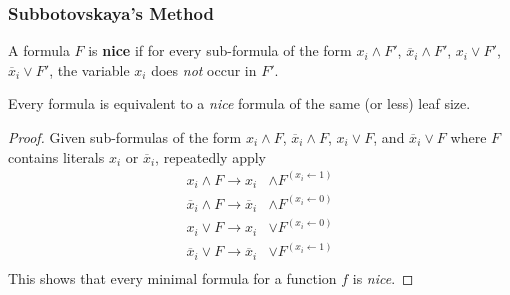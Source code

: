 \documentclass[11pt]{article}
\begin{document}
	\subsubsection{Subbotovskaya's Method} 
	\begin{definition}
		A formula $F$ is \textbf{nice} if for every sub-formula of the form $x_i \land F'$, $\overline{x}_i \land F'$, $x_i \lor F'$, $\overline{x}_i \lor F'$, the variable $x_i$ does \emph{not} occur in $F'$.
	\end{definition}
	
	\begin{lemma}
		Every formula is equivalent to a \emph{nice} formula of the same (or less) leaf size.
	\end{lemma}
	\begin{proof}
		Given sub-formulas of the form $x_i \land F$, $\overline{x}_i \land F$, $x_i \lor F$, and $\overline{x}_i \lor F$ where $F$ contains literals $x_i$ or $\overline{x}_i$, repeatedly apply 
		\begin{align*}
			x_i \land F \rightarrow x_i &\land F^{(x_i \leftarrow 1)}\\
			\overline{x}_i \land F \rightarrow \overline{x}_i &\land F^{(x_i \leftarrow 0)}\\
			x_i \lor F \rightarrow x_i &\lor F^{(x_i \leftarrow 0)}\\
			\overline{x}_i \lor F \rightarrow \overline{x}_i &\lor F^{(x_i \leftarrow 1)}\\
		\end{align*}
		This shows that every minimal formula for a function $f$ is \emph{nice}.
	\end{proof}
	
\end{document}
